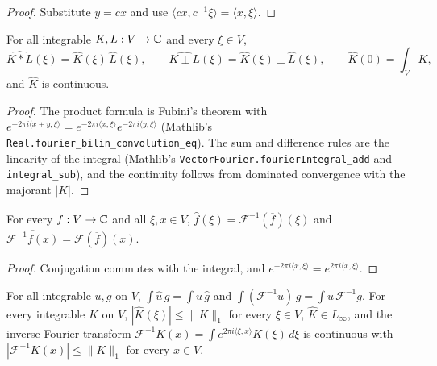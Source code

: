 \begin{proof}
\leanok
Substitute $y = c x$ and use $\langle c x, c^{-1} \xi \rangle = \langle x, \xi \rangle$.
\end{proof}

\begin{lemma}
\label{lem:fourier-conv}
\leanok
{}
For all integrable $K, L : V \to \mathbb{C}$ and every $\xi \in V$,
\[
  \widehat{K * L}(\xi) = \widehat K(\xi) \, \widehat L(\xi), \qquad
  \widehat{K \pm L}(\xi) = \widehat K(\xi) \pm \widehat L(\xi), \qquad
  \widehat K(0) = \int_V K ,
\]
and $\widehat K$ is continuous.
\end{lemma}

\begin{proof}
\leanok
The product formula is Fubini's theorem with $e^{-2\pi i \langle x + y, \xi \rangle} =
e^{-2\pi i \langle x, \xi \rangle} e^{-2\pi i \langle y, \xi \rangle}$ (Mathlib's
\texttt{Real.\allowbreak fourier\_\allowbreak bilin\_\allowbreak convolution\_\allowbreak eq}).
The sum and difference rules are the linearity of the integral (Mathlib's
\texttt{VectorFourier.\allowbreak fourierIntegral\_\allowbreak add} and
\texttt{integral\_\allowbreak sub}), and the continuity follows from dominated convergence with
the majorant $|K|$.
\end{proof}

\begin{lemma}
\label{lem:fourier-conjugation}
\leanok
For every $f : V \to \mathbb{C}$ and all $\xi, x \in V$,
$\overline{\widehat f(\xi)} = \mathcal F^{-1}(\overline f)(\xi)$ and
$\overline{\mathcal F^{-1} f(x)} = \mathcal F(\overline f)(x)$.
\end{lemma}

\begin{proof}
\leanok
Conjugation commutes with the integral, and $\overline{e^{-2\pi i \langle x, \xi \rangle}} =
e^{2\pi i \langle x, \xi \rangle}$.
\end{proof}

\begin{lemma}
\label{lem:fourier-integrable}
\leanok
{}
For all integrable $u, g$ on $V$, $\int \widehat u \, g = \int u \, \widehat g$ and
$\int (\mathcal F^{-1} u) \, g = \int u \, \mathcal F^{-1} g$. For every integrable $K$ on $V$,
$|\widehat K(\xi)| \leq \|K\|_1$ for every $\xi \in V$, $\widehat K \in L_\infty$, and the inverse
Fourier transform
$\mathcal F^{-1} K(x) = \int e^{2 \pi i \langle \xi, x \rangle} K(\xi) \, d\xi$ is continuous
with $|\mathcal F^{-1} K(x)| \leq \|K\|_1$ for every $x \in V$.
\end{lemma}

